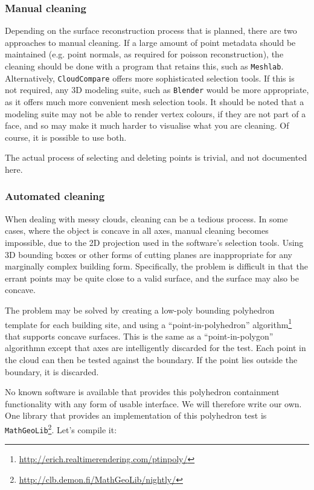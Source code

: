 \subsubsection{Manual cleaning}
Depending on the surface reconstruction process that is planned, there are two approaches to manual cleaning. If a large amount of point metadata should be maintained (e.g. point normals, as required for poisson reconstruction), the cleaning should be done with a program that retains this, such as {\tt Meshlab}. Alternatively, {\tt CloudCompare} offers more sophisticated selection tools. If this is not required, any 3D modeling suite, such as {\tt Blender} would be more appropriate, as it offers much more convenient mesh selection tools. It should be noted that a modeling suite may not be able to render vertex colours, if they are not part of a face, and so may make it much harder to visualise what you are cleaning. Of course, it is possible to use both.

The actual process of selecting and deleting points is trivial, and not documented here.

\subsubsection{Automated cleaning}

When dealing with messy clouds, cleaning can be a tedious process. In some cases, where the object is concave in all axes, manual cleaning becomes impossible, due to the 2D projection used in the software's selection tools. Using 3D bounding boxes or other forms of cutting planes are inappropriate for any marginally complex building form. Specifically, the problem is difficult in that the errant points may be quite close to a valid surface, and the surface may also be concave.

The problem may be solved by creating a low-poly bounding polyhedron template for each building site, and using a ``point-in-polyhedron'' algorithm\footnote{\url{http://erich.realtimerendering.com/ptinpoly/}} that supports concave surfaces. This is the same as a ``point-in-polygon'' algorithmn except that axes are intelligently discarded for the test. Each point in the cloud can then be tested against the boundary. If the point lies outside the boundary, it is discarded.

No known software is available that provides this polyhedron containment functionality with any form of usable interface. We will therefore write our own. One library that provides an implementation of this polyhedron test is {\tt MathGeoLib}\footnote{\url{http://clb.demon.fi/MathGeoLib/nightly/}}. Let's compile it:

